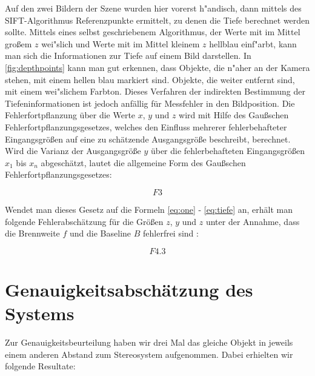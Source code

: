 \noindent Auf den zwei Bildern der Szene wurden hier vorerst h"andisch, dann mittels des SIFT-Algorithmus Referenzpunkte ermittelt, zu denen die Tiefe berechnet werden sollte.\newline
\noindent Mittels eines selbst geschriebenem Algorithmus, der Werte mit im Mittel großem $z$ wei"slich und Werte mit im Mittel kleinem $z$ hellblau einf"arbt, kann man sich die Informationen zur Tiefe auf einem Bild darstellen. In \ref{fig:depthpoints} kann man gut erkennen, dass Objekte, die n"aher an der Kamera stehen, mit einem hellen blau markiert sind. Objekte, die weiter entfernt sind, mit einem wei"slichem Farbton.\newline
\noindent Dieses Verfahren der indirekten Bestimmung der Tiefeninformationen ist jedoch anfällig für Messfehler in den Bildposition. Die Fehlerfortpflanzung über die Werte $x$, $y$ und $z$ wird mit Hilfe des Gaußschen Fehlerfortpflanzungsgesetzes, welches den Einfluss mehrerer fehlerbehafteter Eingangsgrößen auf eine zu schätzende Ausgangsgröße beschreibt, berechnet.
Wird die Varianz der Ausgangsgröße $y$ über die fehlerbehafteten Eingangsgrößen $x_{1}$ bis $x_{n}$  abgeschätzt, lautet die allgemeine Form des Gaußschen Fehlerfortpflanzungsgesetzes:

\begin{equation}
F3
\end{equation}

\noindent Wendet man dieses Gesetz auf die Formeln \ref{eq:one} - \ref{eq:tiefe} an, erhält man folgende Fehlerabschätzung für die Größen $z$, $y$ und $z$ unter der Annahme, dass die Brennweite $f$ und die Baseline $B$ fehlerfrei sind \cite{frz}:

\begin{equation}
F4.3
\end{equation}

\section{Genauigkeitsabschätzung des Systems}
\label{sec:genauigkeit}

Zur Genauigkeitsbeurteilung haben wir drei Mal das gleiche Objekt in jeweils einem anderen Abstand zum Stereosystem aufgenommen. Dabei erhielten wir folgende Resultate: